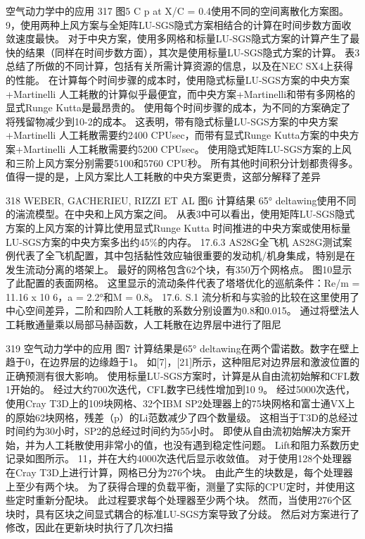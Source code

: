 \documentclass[UTF8,11pt,a4paper,openany,fontset=fandol]{ctexbook}
\begin{document}
空气动力学中的应用 317 图5 C p at X/C = 0.4使用不同的空间离散化方案图。 9，使用两种上风方案与全矩阵LU-SGS隐式方案相结合的计算在时间步数方面收敛速度最快。 对于中央方案，使用多网格和标量LU-SGS隐式方案的计算产生了最快的结果（同样在时间步数方面），其次是使用标量LU-SGS隐式方案的计算。 表3总结了所做的不同计算，包括有关所需计算资源的信息，以及在NEC SX4上获得的性能。 在计算每个时间步骤的成本时，使用隐式标量LU-SGS方案的中央方案+Martinelli 人工耗散的计算似乎最便宜，而中央方案+Martinelli和带有多网格的显式Runge Kutta是最昂贵的。 使用每个时间步骤的成本，为不同的方案确定了将残留物减少到10-2的成本。 这表明，带有隐式标量LU-SGS方案的中央方案+Martinelli 人工耗散需要约2400 CPUsec，而带有显式Runge Kutta方案的中央方案+Martinelli 人工耗散需要约5200 CPUsec。 使用隐式矩阵LU-SGS方案的上风和三阶上风方案分别需要5100和5760 CPU秒。 所有其他时间积分计划都贵得多。 值得一提的是，上风方案比人工耗散的中央方案更贵，这部分解释了差异

318 WEBER, GACHERIEU, RIZZI ET AL 图6 计算结果 65° deltawing使用不同的湍流模型。在中央和上风方案之间。 从表3中可以看出，使用矩阵LU-SGS隐式方案的上风方案的计算比使用显式Runge Kutta 时间推进的中央方案或使用标量LU-SGS方案的中央方案多出约45\%的内存。 17.6.3 AS28G全飞机 AS28G测试案例代表了全飞机配置，其中包括黏性效应轴很重要的发动机/机身集成，特别是在发生流动分离的塔架上。 最好的网格包含62个块，有350万个网格点。 图10显示了此配置的表面网格。 这里显示的流动条件代表了塔塔优化的巡航条件：Re/m = 11.16 x 10 6，a = 2.2°和M = 0.8。 17.6. S.1 流分析和与实验的比较在这里使用了中心空间差异，二阶和四阶人工耗散的系数分别设置为0.8和0.015。 通过将壁法人工耗散通量乘以局部马赫函数，人工耗散在边界层中进行了阻尼

319 空气动力学中的应用 图7 计算结果是65° deltawing在两个雷诺数。数字在壁上趋于0，在边界层的边缘趋于1。 如[7]，[21]所示，这种阻尼对边界层和激波位置的正确预测有很大影响。 使用标量LU-SGS方案时，计算是从自由流初始解和CFL数1开始的。 经过大约700次迭代，CFL数字已线性增加到10 9。 经过5000次迭代，使用Cray T3D上的109块网格、32个IBM SP2处理器上的75块网格和富士通VX上的原始62块网格，残差（p）的Li范数减少了四个数量级。 这相当于T3D的总经过时间约为30小时，SP2的总经过时间约为55小时。 即使从自由流初始解决方案开始，并为人工耗散使用非常小的值，也没有遇到稳定性问题。 Lift和阻力系数历史记录如图所示。 11，并在大约4000次迭代后显示收敛值。 对于使用128个处理器在Cray T3D上进行计算，网格已分为276个块。 由此产生的块数是，每个处理器上至少有两个块。 为了获得合理的负载平衡，测量了实际的CPU定时，并使用这些定时重新分配块。 此过程要求每个处理器至少两个块。 然而，当使用276个区块时，具有区块之间显式耦合的标准LU-SGS方案导致了分歧。 然后对方案进行了修改，因此在更新块时执行了几次扫描
\end{document}
